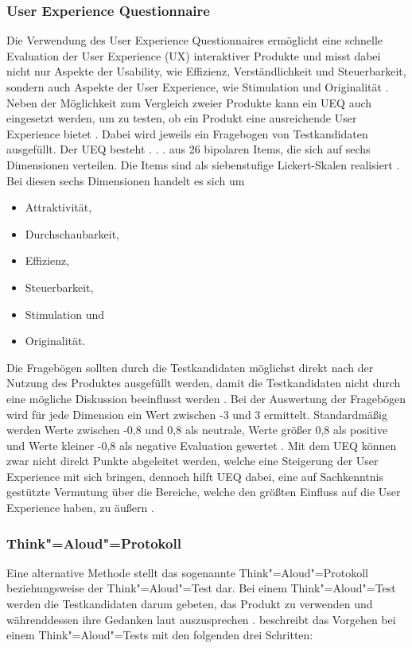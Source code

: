 \subsubsection{User Experience Questionnaire}
Die Verwendung des User Experience Questionnaires ermöglicht eine schnelle Evaluation der User Experience (UX) interaktiver Produkte und misst dabei nicht nur Aspekte der Usability, wie Effizienz, Verständlichkeit und Steuerbarkeit, sondern auch Aspekte der User Experience, wie Stimulation und Originalität \citep{rauschenberger2013efficient}. Neben der Möglichkeit zum Vergleich zweier Produkte kann ein UEQ auch eingesetzt werden, um zu testen, ob ein Produkt eine ausreichende User Experience bietet \citep{schrepp2018user}. Dabei wird jeweils ein Fragebogen von Testkandidaten ausgefüllt. \glqq Der UEQ besteht . . . aus 26 bipolaren Items, die sich auf sechs Dimensionen verteilen. Die Items sind als siebenstufige Lickert-Skalen realisiert\grqq{} \citep{rauschenberger2013user}. Bei diesen sechs Dimensionen handelt es sich um

\begin{itemize}
\item Attraktivität,
\item Durchschaubarkeit,
\item Effizienz,
\item Steuerbarkeit,
\item Stimulation und
\item Originalität.
\end{itemize}

Die Fragebögen sollten durch die Testkandidaten möglichst direkt nach der Nutzung des Produktes ausgefüllt werden, damit die Testkandidaten nicht durch eine mögliche Diskussion beeinflusst werden \citep{schrepp2018user}. Bei der Auswertung der Fragebögen wird für jede Dimension ein Wert zwischen -3 und 3 ermittelt. Standardmäßig werden Werte zwischen -0,8 und 0,8 als neutrale, Werte größer 0,8 als positive und Werte kleiner -0,8 als negative Evaluation gewertet \citep{schrepp2018user}. Mit dem UEQ können zwar nicht direkt Punkte abgeleitet werden, welche eine Steigerung der User Experience mit sich bringen, dennoch hilft UEQ dabei, eine auf Sachkenntnis gestützte Vermutung über die Bereiche, welche den größten Einfluss auf die User Experience haben, zu äußern \citep{schrepp2018user}.

\subsubsection{Think"=Aloud"=Protokoll}
Eine alternative Methode stellt das sogenannte Think"=Aloud"=Protokoll beziehungsweise der Think"=Aloud"=Test dar. Bei einem Think"=Aloud"=Test werden die Testkandidaten darum gebeten, das Produkt zu verwenden und währenddessen ihre Gedanken laut auszusprechen \citep{nielsen2012thinking}. \cite{nielsen2012thinking} beschreibt das Vorgehen bei einem Think"=Aloud"=Tests mit den folgenden drei Schritten:

